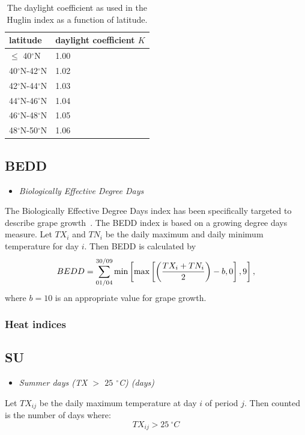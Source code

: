 \documentclass[a4paper,11pt]{article}
\newcommand{\dN}{$^{\circ}$N}
\begin{document}
\begin{table} [!h]
\begin{tabular}{l l}
latitude  & daylight coefficient $K$ \\
\hline
$\le$ 40\dN & 1.00 \\
40\dN-42\dN & 1.02 \\
42\dN-44\dN & 1.03 \\
44\dN-46\dN & 1.04 \\
46\dN-48\dN & 1.05 \\
48\dN-50\dN & 1.06 \\
\end{tabular}
\caption{The daylight coefficient as used in the Huglin index as a function of latitude.
} \label{table:daylightcoef}
\end{table}

\subsection*{BEDD}
\begin{itemize}
\item \textit{Biologically Effective Degree Days}
\end{itemize}
The Biologically Effective Degree Days index has been specifically targeted to describe grape 
growth~\citep{gladstones:92}.
The BEDD index is based on a growing degree days measure. Let $TX_i$ and $TN_i$ be the daily maximum
and daily minimum temperature for day $i$. Then BEDD is calculated by 
\begin{equation}
BEDD = \sum_{01/04}^{30/09} \text{min} \left[ 
\text{max} \left[ \left(\frac{TX_i + TN_i}{2} \right) -b, 0 \right], 9 \right], \notag
\end{equation}
where $b = 10$ is an appropriate value for grape growth.


\subsubsection{Heat indices}

\subsection*{SU}
\begin{itemize}
\item \textit{Summer days (TX $>$ $25$ $^\circ$C) (days)}
\end{itemize}
Let $TX_{ij}$ be the daily maximum temperature at day $i$ of period
$j$. Then counted is the number of days where:
\begin{equation*}
TX_{ij} > 25\:^\circ C
\end{equation*}
\end{document}
